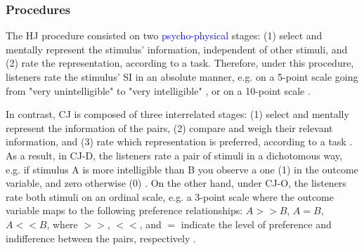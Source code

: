 \subsubsection{Procedures} \label{ss_sect:proc}
%
The HJ procedure consisted on two \textcolor{blue}{psycho-physical} stages: (1) select and mentally represent the stimulus' information, independent of other stimuli, and (2) rate the representation, according to a task. Therefore, under this procedure, listeners rate the stimulus' SI in an absolute manner, e.g. on a 5-point scale going from "very unintelligible" to "very intelligible" \citep{Cox_et_al_1989,Lagerberg_et_al_2014}, or on a 10-point scale \citep{Boonen_et_al_2021, Faes_et_al_2021}.

In contrast, CJ is composed of three interrelated stages: (1) select and mentally represent the information of the pairs, (2) compare and weigh their relevant information, and (3) rate which representation is preferred, according to a task \citep{vanDaal_2020}. As a result, in CJ-D, the listeners rate a pair of stimuli in a dichotomous way, e.g. if stimulus A is more intelligible than B you observe a one (1) in the outcome variable, and zero otherwise (0) \citep{Bradley_et_al_1952}. On the other hand, under CJ-O, the listeners rate both stimuli on an ordinal scale, e.g. a 3-point scale where the outcome variable maps to the following preference relationships: $A>>B$, $A=B$, $A<<B$, where $>>$, $<<$, and $=$ indicate the level of preference and indifference between the pairs, respectively \citep{Tutz_1986, Agresti_1992}.
%
%
